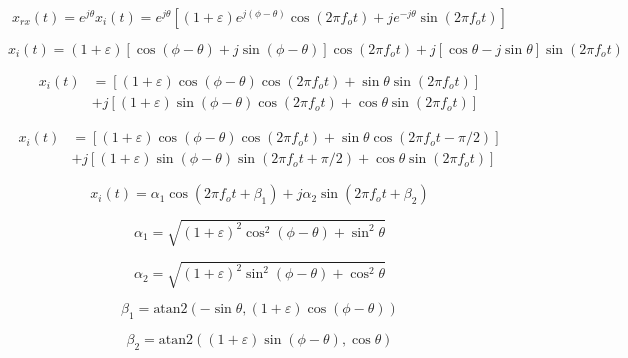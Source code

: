 \documentclass{article}
\begin{document}
\begin{equation}
	x_{rx}(t) = e^{j\theta}x_i(t) = e^{j\theta}\left[(1+\varepsilon)e^{j(\phi-\theta)}\cos(2{\pi}f_ot)+je^{-j\theta}\sin(2{\pi}f_ot)\right]
\end{equation}

\begin{equation}
	x_i(t) = (1+\varepsilon)[\cos(\phi-\theta)+j\sin(\phi-\theta)]\cos(2{\pi}f_ot)+j[\cos\theta-j\sin\theta]\sin(2{\pi}f_ot)
\end{equation}

\begin{equation}
\begin{split}
	x_i(t) &= \left[(1+\varepsilon)\cos(\phi-\theta)\cos(2{\pi}f_ot)+\sin\theta\sin(2{\pi}f_ot)\right]\\
	&+j\left[(1+\varepsilon)\sin(\phi-\theta)\cos(2{\pi}f_ot)+\cos\theta\sin(2{\pi}f_ot)\right]
\end{split}
\end{equation}

\begin{equation}
\begin{split}
	x_i(t) &= \left[(1+\varepsilon)\cos(\phi-\theta)\cos(2{\pi}f_ot)+\sin\theta\cos(2{\pi}f_ot-\pi/2)\right]\\
	&+j\left[(1+\varepsilon)\sin(\phi-\theta)\sin(2{\pi}f_ot+\pi/2)+\cos\theta\sin(2{\pi}f_ot)\right]
\end{split}
\end{equation}

\begin{equation}
	x_i(t) = \alpha_1\cos(2{\pi}f_ot+\beta_1)+j\alpha_2\sin(2{\pi}f_ot+\beta_2)
\end{equation}

\begin{equation}
	\alpha_1 = \sqrt{(1+\varepsilon)^2\cos^2(\phi-\theta)+\sin^2\theta}
\end{equation}

\begin{equation}
	\alpha_2 = \sqrt{(1+\varepsilon)^2\sin^2(\phi-\theta)+\cos^2\theta}
\end{equation}

\begin{equation}
	\beta_1 = \text{atan2}(-\sin\theta,(1+\varepsilon)\cos(\phi-\theta))
\end{equation}

\begin{equation}
	\beta_2 = \text{atan2}((1+\varepsilon)\sin(\phi-\theta),\cos\theta)
\end{equation}
\end{document}
